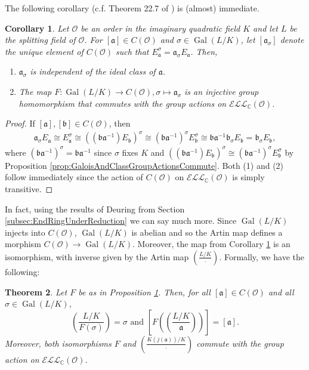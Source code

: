 \documentclass{amsart}
\newtheorem{thm}{Theorem}[section]
\newtheorem{cor}[thm]{Corollary}
\theoremstyle{definition}
\theoremstyle{remark}
\numberwithin{equation}{section}
\newcommand{\cE}{\mathcal E}
\newcommand{\cL}{\mathcal L}
\newcommand{\cO}{\mathcal O}
\newcommand{\fka}{\mathfrak a}
\newcommand{\fkb}{\mathfrak b}
\newcommand{\bbC}{\mathbb C}
\newcommand{\inv}{^{-1}}
\newcommand{\ELL}{\cE\cL\cL}
\newcommand{\artin}[2]{\left( \frac{#1}{#2}\right)}
\DeclareMathOperator{\Gal}{Gal}
\begin{document}
 The following corollary (c.f. Theorem 22.7 of \cite{SutherlandLN}) is (almost) immediate.
 
 \begin{cor} \label{cor:GaloisInjectsIntoClassGroup}
 Let $\cO$ be an order in the imaginary quadratic field $K$ and let $L$ be the splitting field of $\cO$. For $[\fka] \in C(\cO)$ and $\sigma \in \Gal(L/K)$, let $[\fka_{\sigma}]$ denote the unique element of $C(\cO)$ such that $E_{\fka}^{\sigma} = \fka_{\sigma} E_{\fka}$. Then, 
 \begin{enumerate}
 \item $\fka_{\sigma}$ is independent of the ideal class of $\fka$.
 \item The map $F: \Gal(L/K) \to C(\cO), \sigma \mapsto \fka_{\sigma}$ is an injective group homomorphism that commutes with the group actions on $\ELL_{\bbC}(\cO)$.
 \end{enumerate}
 \end{cor}
 
 \begin{proof}
 If $[\fka], [\fkb] \in C(\cO)$, then
 \begin{align*}
 \fka_{\sigma} E_{\fka} \cong E_{\fka}^{\sigma} \cong ((\fkb \fka\inv) E_{\fkb})^{\sigma} \cong (\fkb \fka\inv)^{\sigma} E_{\fkb}^{\sigma} \cong \fkb \fka\inv \fkb_{\sigma} E_{\fkb} = \fkb_{\sigma} E_{\fkb},
 \end{align*}
 where $(\fkb \fka\inv)^{\sigma} = \fkb \fka\inv$ since $\sigma$ fixes $K$ and $((\fkb \fka\inv) E_{\fkb})^{\sigma} \cong (\fkb \fka\inv)^{\sigma} E_{\fkb}^{\sigma}$ by Proposition \ref{prop:GaloisAndClassGroupActionsCommute}. Both (1) and (2) follow immediately since the action of $C(\cO)$ on $\ELL_{\bbC}(\cO)$ is simply transitive.
 \end{proof}


 In fact, using the results of Deuring from Section \ref{subsec:EndRingUnderReduction}
 we can say much more. Since $\Gal(L/K)$ injects into $C(\cO)$, $\Gal(L/K)$ is abelian and so the Artin map defines a morphism $C(\cO) \to \Gal(L/K)$. Moreover, the map from Corollary \ref{cor:GaloisInjectsIntoClassGroup} is an isomorphism, with inverse given by the Artin map $\artin{L/K}{\cdot}$. Formally, we have the following:
 
 \begin{thm} \label{thm:GaloisIsomClassGroup}
 Let $F$ be as in Proposition \ref{cor:GaloisInjectsIntoClassGroup}. Then, for all $[\fka] \in C(\cO)$ and all $\sigma \in \Gal(L/K)$, 
 \[
 \artin{L/K}{F(\sigma)} = \sigma \text{ and } \left[F\left(\artin{L/K}{\fka}\right)\right] = [\fka].
 \]
 Moreover, both isomorphisms $F$ and $\artin{K(j(\fka))/K}{\cdot}$ commute with the group action on $\ELL_{\bbC}(\cO)$.
 \end{thm}
\end{document}
